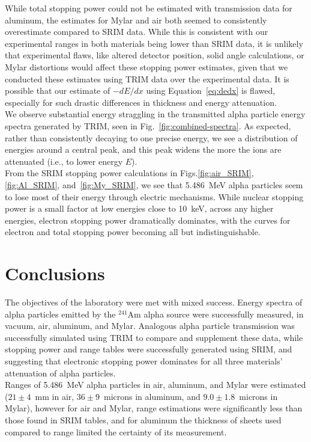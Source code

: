 \documentclass[12pt]{article}
\newcommand{\figref}[1]{Fig.~\ref{#1}}
\newcommand{\AmSrc}{\xspace$^{241}$Am\xspace}
\begin{document}
While total stopping power could not be estimated with transmission data for aluminum, the estimates for Mylar and air both seemed to consistently overestimate compared to SRIM data.
While this is consistent with our experimental ranges in both materials being lower than SRIM data, it is unlikely that experimental flaws, like altered detector position, solid angle calculations, or Mylar distortions would affect these stopping power estimates, given that we conducted these estimates using TRIM data over the experimental data.
It is possible that our estimate of $-dE/dx$ using Equation~\ref{eq:dedx} is flawed, especially for such drastic differences in thickness and energy attenuation.\\

We observe substantial energy straggling in the transmitted alpha particle energy spectra generated by TRIM, seen in \figref{fig:combined-spectra}.
As expected, rather than consistently decaying to one precise energy, we see a distribution of energies around a central peak, and this peak widens the more the ions are attenuated (i.e., to lower energy $E$).\\

From the SRIM stopping power calculations in Figs.\ref{fig:air_SRIM}, \ref{fig:Al_SRIM}, and~\ref{fig:My_SRIM}, we see that 5.486~MeV alpha particles seem to lose most of their energy through electric mechanisms.
While nuclear stopping power is a small factor at low energies close to 10~keV, across any higher energies, electron stopping power dramatically dominates, with the curves for electron and total stopping power becoming all but indistinguishable.

\section{Conclusions}\label{sec:conc}

The objectives of the laboratory were met with mixed success.
Energy spectra of alpha particles emitted by the \AmSrc alpha source were successfully measured, in vacuum, air, aluminum, and Mylar.
Analogous alpha particle transmission was successfully simulated using TRIM to compare and supplement these data, while stopping power and range tables were successfully generated using SRIM, and suggesting that electronic stopping power dominates for all three materials' attenuation of alpha particles.\\

Ranges of 5.486~MeV alpha particles in air, aluminum, and Mylar were estimated ($21\pm4$~mm in air, $36\pm9$~microns in aluminum, and $9.0\pm1.8$~microns in Mylar), however for air and Mylar, range estimations were significantly less than those found in SRIM tables, and for aluminum the thickness of sheets used compared to range limited the certainty of its measurement.\\
\end{document}
